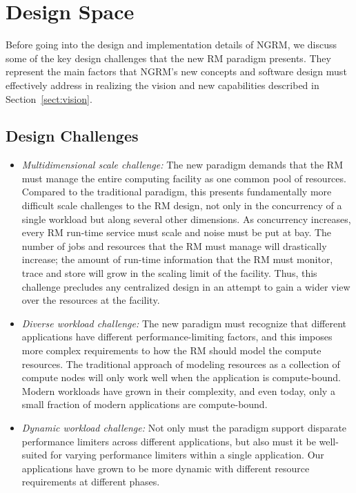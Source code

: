\documentclass{article}
\newcommand{\ngrm}{NGRM}
\begin{document}
\section{Design Space}
\label{sect:designspace}

Before going into the design and implementation details of \ngrm, we discuss 
some of the key design challenges that the new RM paradigm presents. 
They represent the main factors that \ngrm's new concepts and software design
must effectively address in realizing the vision and new capabilities described in 
Section~\ref{sect:vision}. 

\subsection{Design Challenges}

\begin{itemize}
\item{\sl Multidimensional scale challenge:} The new paradigm demands that 
      the RM must manage the entire computing facility as one common pool of 
      resources. Compared to the traditional paradigm, this presents 
      fundamentally more difficult scale challenges to the RM design,
      not only in the concurrency of a single workload but along
      several other dimensions. As concurrency increases, every RM run-time
      service must scale and noise must be put at bay.  
      The number of jobs and resources 
      that the RM must manage will drastically increase; the amount 
      of run-time information that the RM must monitor, trace and store 
      will grow in the scaling limit of the facility.
      Thus, this challenge precludes any centralized design in an attempt to 
      gain a wider view over the resources at the facility. 

\item{\sl Diverse workload challenge:} The new paradigm must recognize that
      different applications have different performance-limiting factors,
      and this imposes more complex requirements to how the RM should
      model the compute resources. The traditional approach of modeling 
      resources as a collection of compute nodes will only work well when the
      application is compute-bound. Modern workloads have grown in their
      complexity, and even today, only a small fraction of modern applications
      are compute-bound.
       
\item{\sl Dynamic workload challenge:} Not only must the paradigm support 
      disparate performance limiters across different applications, but
      also must it be well-suited for varying performance limiters within 
      a single application. Our applications have grown to be more
      dynamic with different resource requirements at different
      phases.


\end{itemize}
\end{document}
